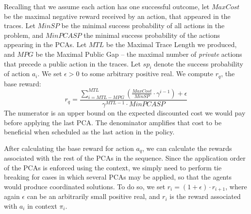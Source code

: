 \documentclass[letterpaper]{article} %
\theoremstyle{definition}
\newcommand{\eliran}[1]{\textbf{[\color{red}ELIRAN:#1]}}
\newcommand{\ronen}[1]{\textbf{[\color{blue}RONEN:#1]}}
\begin{document}
Recalling that we assume each action has one successful outcome,
let $MaxCost$ be the maximal negative reward received by an action, that appeared in the traces.
Let $MinSP$ be the minimal success probability of all actions in the problem, and $MinPCASP$ the minimal success probability of the actions appearing in the PCAs. Let $MTL$ be the Maximal Trace Length we produced, and $MPG$ be the Maximal Public Gap -- the maximal number of \emph{private} actions that precede a public action in the traces. Let $sp_i$ denote the success probability of action $a_i$. We set $\epsilon > 0$ to some arbitrary positive real. We compute $r_q$, the base reward:
\begin{equation}
\label{eqn:rq}
   r_q = \frac{\sum_{i=MTL - MPG}^{MTL}(\frac{MaxCost}{MinSP} \cdot \gamma^{i-1})+ \epsilon}{\gamma^{MTL-1}\cdot MinPCASP} 
\end{equation}%
The numerator is an upper bound on the expected discounted cost we would pay before applying the last PCA. The denominator amplifies that cost to be beneficial when scheduled as the last action in the policy.


After calculating the base reward for action $a_q$, 
we can calculate the rewards associated with the rest of the PCAs in the sequence. Since the application order of the PCAs is enforced using the context, we simply need to perform tie breaking for cases in which several PCAs may be applied, so that the agents would produce coordinated solutions.
To do so, we set $r_i=(1+\epsilon)\cdot r_{i+1}$, where again $\epsilon$ can be an arbitrarily small positive real, and $r_i$ is
the reward associated with $a_i$ in context $\pi_i$.
\end{document}
